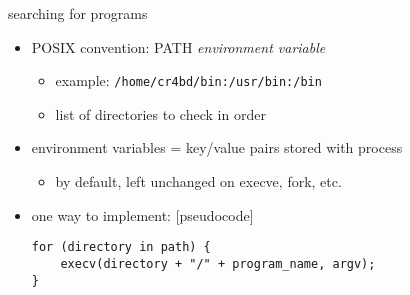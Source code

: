 
\begin{frame}[fragile,label=searchForPrograms]{searching for programs}
\begin{itemize}
    \item POSIX convention: PATH \textit{environment variable}
        \begin{itemize}
        \item example: \texttt{/home/cr4bd/bin:/usr/bin:/bin} 
        \item list of directories to check in order
        \end{itemize}
    \item environment variables = key/value pairs stored with process
        \begin{itemize}
        \item by default, left unchanged on execve, fork, etc.
        \end{itemize}
    \item one way to implement:  [pseudocode]
\begin{lstlisting}
for (directory in path) {
    execv(directory + "/" + program_name, argv);
}
\end{lstlisting}
\end{itemize}
\end{frame}
